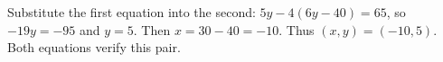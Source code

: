 Substitute the first equation into the second: $5y-4(6y-40)=65$, so $-19y=-95$ and $y=5$. Then $x=30-40=-10$. Thus $\boxed{(x,y)=(-10,5)}$. Both equations verify this pair.
